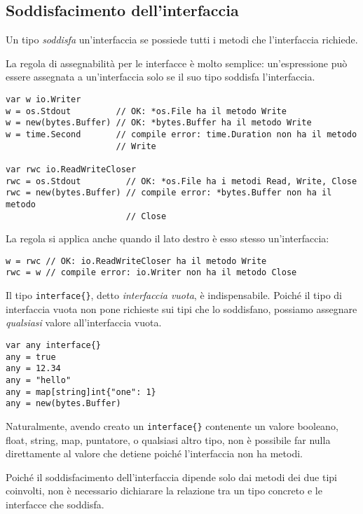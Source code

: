 \documentclass[../../thesis.tex]{subfiles}
\begin{document}
    \subsection{Soddisfacimento dell'interfaccia}\label{subsec:soddisfacimento-dell'interfaccia}
    Un tipo \textit{soddisfa} un'interfaccia se possiede tutti i metodi che l'interfaccia richiede.
    \hfill \vspace{12pt}

    La regola di assegnabilità per le interfacce è molto semplice: un'espressione può essere assegnata a un'interfaccia solo se il suo tipo soddisfa l'interfaccia.
    \begin{lstlisting}[frame = single, label = {lst:lstlisting6-3.1}]
var w io.Writer
w = os.Stdout         // OK: *os.File ha il metodo Write
w = new(bytes.Buffer) // OK: *bytes.Buffer ha il metodo Write
w = time.Second       // compile error: time.Duration non ha il metodo
                      // Write

var rwc io.ReadWriteCloser
rwc = os.Stdout         // OK: *os.File ha i metodi Read, Write, Close
rwc = new(bytes.Buffer) // compile error: *bytes.Buffer non ha il metodo
                        // Close
    \end{lstlisting}
    La regola si applica anche quando il lato destro è esso stesso un'interfaccia:
    \begin{lstlisting}[frame = single, label = {lst:lstlisting6-3.2}]
w = rwc // OK: io.ReadWriteCloser ha il metodo Write
rwc = w // compile error: io.Writer non ha il metodo Close
    \end{lstlisting}
    Il tipo \verb"interface{}", detto \textit{interfaccia vuota}, è indispensabile.
    Poiché il tipo di interfaccia vuota non pone richieste sui tipi che lo soddisfano, possiamo assegnare \textit{qualsiasi} valore all'interfaccia vuota.
    \begin{lstlisting}[frame = single, label = {lst:lstlisting6-3.3}]
var any interface{}
any = true
any = 12.34
any = "hello"
any = map[string]int{"one": 1}
any = new(bytes.Buffer)
    \end{lstlisting}
    Naturalmente, avendo creato un \verb"interface{}" contenente un valore booleano, float, string, map, puntatore, o qualsiasi altro tipo, non è possibile far nulla direttamente al valore che detiene poiché l'interfaccia non ha metodi.
    \hfill \vspace{12pt}

    Poiché il soddisfacimento dell'interfaccia dipende solo dai metodi dei due tipi coinvolti, non è necessario dichiarare la relazione tra un tipo concreto e le interfacce che soddisfa.
    \hfill \vspace{12pt}
\end{document}
